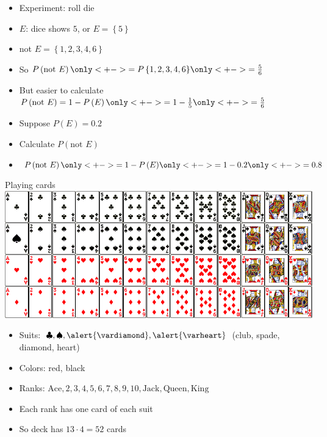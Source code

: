 \documentclass[handout]{beamer}
\theoremstyle{definition}
\begin{document}
\begin{frame}
\begin{example}
\begin{itemize}
\item Experiment: roll die
\item $E$: dice shows $5$, or $E=\left\{5\right\}$
\item not $E=\left\{1,2,3,4,6\right\}$
\item So $P\left(\text{not $E$}\right)
\only<+->{=P\left\{1,2,3,4,6\right\}}
\only<+->{=\frac{5}{6}}$
\item But easier to calculate 
$P\left(\text{not $E$}\right)=1-P\left(E\right)
\only<+->{=1-\frac{1}{5}}
\only<+->{=\frac{5}{6}}$
\end{itemize}
\end{example}
\begin{example}
\begin{itemize}
\item Suppose $P\left(E\right)=0.2$
\item Calculate $P\left(\text{not $E$}\right)$
\item $P\left(\text{not $E$}\right)
\only<+->{=1-P\left(E\right)}
\only<+->{=1-0.2}\only<+->{=0.8}$
\end{itemize}
\end{example}
\end{frame}

\begin{frame}{Playing cards}
\includegraphics[scale=.34]{Cards}
\begin{itemize}
\item Suits: $\clubsuit,\spadesuit,\alert{\vardiamond},\alert{\varheart}$
(club, spade, diamond, heart)
\item Colors: \alert{red}, black
\item Ranks: $\text{Ace},2,3,4,5,6,7,8,9,10,\text{Jack},\text{Queen},\text{King}$
\item Each rank has one card of each suit
\item So deck has $13\cdot 4=52$ cards
\end{itemize}
\end{frame}
\end{document}
